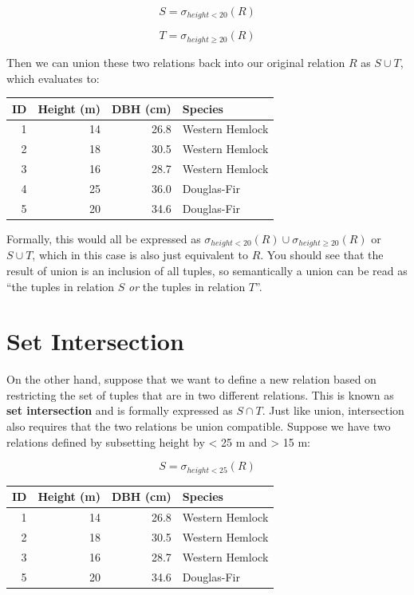 \documentclass[
]{book}
\begin{document}
\[
S = σ_{height<20}(R)
\]

\[
T = σ_{height≥20}(R)
\]

Then we can union these two relations back into our original relation \(R\) as \(S∪T\), which evaluates to:

\begin{tabular}{rrrl}
\toprule
ID & Height (m) & DBH (cm) & Species\\
\midrule
1 & 14 & 26.8 & Western Hemlock\\
2 & 18 & 30.5 & Western Hemlock\\
3 & 16 & 28.7 & Western Hemlock\\
4 & 25 & 36.0 & Douglas-Fir\\
5 & 20 & 34.6 & Douglas-Fir\\
\bottomrule
\end{tabular}

Formally, this would all be expressed as \(σ_{height<20}(R)∪σ_{height≥20}(R)\) or \(S∪T\), which in this case is also just equivalent to \(R\). You should see that the result of union is an inclusion of all tuples, so semantically a union can be read as ``the tuples in relation \(S\) \emph{or} the tuples in relation \(T\)''.

\hypertarget{set-intersection}{%
\section{Set Intersection}\label{set-intersection}}

On the other hand, suppose that we want to define a new relation based on restricting the set of tuples that are in two different relations. This is known as \textbf{set intersection} and is formally expressed as \(S∩T\). Just like union, intersection also requires that the two relations be union compatible. Suppose we have two relations defined by subsetting height by \textless{} 25 m and \textgreater{} 15 m:

\[S = σ_{height<25}(R)\]

\begin{tabular}{rrrl}
\toprule
ID & Height (m) & DBH (cm) & Species\\
\midrule
1 & 14 & 26.8 & Western Hemlock\\
2 & 18 & 30.5 & Western Hemlock\\
3 & 16 & 28.7 & Western Hemlock\\
5 & 20 & 34.6 & Douglas-Fir\\
\bottomrule
\end{tabular}
\end{document}
